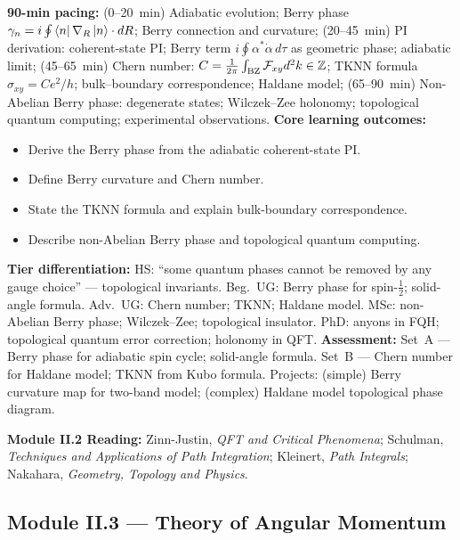 \documentclass[11pt,a4paper]{article}
\begin{document}
\begin{tcolorbox}[modulebox, title={Module~II.2 / L12: Berry Phase from Path Integrals}]
\textbf{90-min pacing:} (0--20~min) Adiabatic evolution; Berry phase $\gamma_n=i\oint\bra{n}\nabla_R\ket{n}\cdot dR$; Berry connection and curvature; (20--45~min) PI derivation: coherent-state PI; Berry term $i\oint\alpha^*\dot\alpha\,d\tau$ as geometric phase; adiabatic limit; (45--65~min) Chern number: $C=\tfrac{1}{2\pi}\int_{\rm BZ}\mathcal{F}_{xy}d^2k\in\mathbb{Z}$; TKNN formula $\sigma_{xy}=Ce^2/h$; bulk--boundary correspondence; Haldane model; (65--90~min) Non-Abelian Berry phase: degenerate states; Wilczek--Zee holonomy; topological quantum computing; experimental observations.
\medskip\textbf{Core learning outcomes:}
\begin{itemize}[leftmargin=1.4em,topsep=2pt,itemsep=1pt]
  \item Derive the Berry phase from the adiabatic coherent-state PI.
  \item Define Berry curvature and Chern number.
  \item State the TKNN formula and explain bulk-boundary correspondence.
  \item Describe non-Abelian Berry phase and topological quantum computing.
\end{itemize}
\medskip\textbf{Tier differentiation:}
HS: ``some quantum phases cannot be removed by any gauge choice'' --- topological invariants.
Beg.\ UG: Berry phase for spin-$\tfrac{1}{2}$; solid-angle formula.
Adv.\ UG: Chern number; TKNN; Haldane model.
MSc: non-Abelian Berry phase; Wilczek--Zee; topological insulator.
PhD: anyons in FQH; topological quantum error correction; holonomy in QFT.
\medskip\textbf{Assessment:}
Set~A --- Berry phase for adiabatic spin cycle; solid-angle formula.
Set~B --- Chern number for Haldane model; TKNN from Kubo formula.
Projects: (simple) Berry curvature map for two-band model; (complex) Haldane model topological phase diagram.
\end{tcolorbox}

\begin{tcolorbox}[highlightbox]
\textbf{Module II.2 Reading:} Zinn-Justin, \textit{QFT and Critical Phenomena}; Schulman, \textit{Techniques and Applications of Path Integration}; Kleinert, \textit{Path Integrals}; Nakahara, \textit{Geometry, Topology and Physics}.
\end{tcolorbox}


\subsection{Module II.3 --- Theory of Angular Momentum}
\label{sec:mod-II3}
\end{document}
